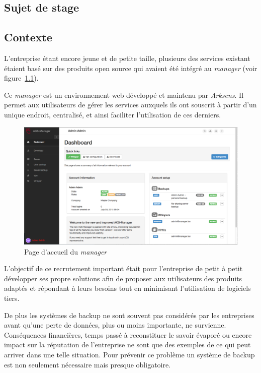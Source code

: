 \documentclass[a4paper,10pt, twoside]{report}
\begin{document}
\begin{spacing}{1.2}
\chapter{Sujet de stage}
\thispagestyle{fancy}
\section{Contexte}
L'entreprise étant encore jeune et de petite taille, plusieurs des services
existant étaient basé sur des produits open source qui avaient été
intégré au \textit{manager} (voir figure~\ref{managerFront}).

Ce \textit{manager} est un environnement web développé et maintenu par
\textit{Arksens}. Il permet aux utilisateurs de gérer les services auxquels
ils ont souscrit à partir d'un unique endroit, centralisé, et ainsi
faciliter l'utilisation de ces derniers.

\begin{figure}[h!]
  \centering
  \includegraphics[width=15cm]{produits/manager.png}
  \caption{\label{managerFront} Page d'accueil du \textit{manager}}
\end{figure}

L'objectif de ce recrutement important était pour l'entreprise de petit à
petit développer ses propre solutions afin de proposer aux utilisateurs des
produits adaptés et répondant à leurs besoins tout en minimisant
l'utilisation de logiciels tiers.

De plus les systèmes de backup ne sont souvent pas considérés par les
entreprises avant qu'une perte de données, plus ou moins importante,
ne survienne. Conséquences financières, temps passé à reconstituer le
savoir évaporé ou encore impact sur la réputation de l'entreprise ne sont
que des exemples de ce qui peut arriver dans une telle situation. Pour
prévenir ce problème un système de backup est non seulement nécessaire
mais presque obligatoire.


\end{spacing}
\end{document}
